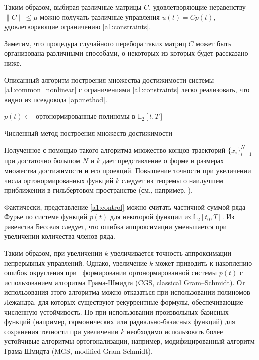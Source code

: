 \documentclass[../main.tex]{subfiles}
\begin{document}
 Таким образом, выбирая различные матрицы $C$, удовлетворяющие неравенству $\| C\| \leqslant \mu $ можно получать различные управления $u(t) = C p(t)$, удовлетворяющие ограничению \eqref{a1:constraints}.
 
 Заметим, что процедура случайного перебора таких матриц $C$ может быть организована различными способами, о некоторых из которых будет рассказано ниже.
 
 Описанный алгоритм построения множества достижимости системы \eqref{a1:common_nonlinear} с ограничениями \eqref{a1:constraints} легко реализовать, что видно из псевдокода \ref{ap:method}.
 \begin{algorithm}[hbt!]
 	$p(t) \gets $ ортонормированные полиномы в $\mathbb{L}_2[t,T]$\;
 	\caption{Численный метод построения множеств достижимости}
 	 \label{ap:method}
 \end{algorithm}
 
 Полученное с помощью такого алгоритма множество концов траекторий $\{x_i\}_{i = 1}^{N}$ при достаточно большом $N$ и $k$ дает представление о форме и размерах множества достижимости и его проекций. 
 Повышение точности при увеличении числа ортонормированных функций $k$ следует из теоремы о наилучшем приближении в гильбертовом пространстве (см., например, \cite{Kolmogorov}). 
 
 Фактически, представление \eqref{a1:control} можно считать частичной суммой ряда Фурье по системе функций $p(t)$ для некоторой функции из $\mathbb{L}_2[t_0, {T}]$. 
 Из равенства Бесселя следует, что ошибка аппроксимации уменьшается при увеличении количества членов ряда. 
 
 Таким образом, при увеличении $k$ увеличивается точность аппроксимации непрерывных управлений. 
 Однако, увеличение $k$ может приводить к накоплению ошибок округления при  формировании ортонормированной системы $p(t)$ с использованием алгоритма Грама-Шмидта (CGS, classical Gram–Schmidt). 
 От использования этого алгоритма можно отказаться при использовании полиномов Лежандра, для которых существуют рекуррентные формулы, обеспечивающие численную устойчивость. 
 Но при использовании произвольных базисных функций (например, гармонических или радиально-базисных функций) для сохранения точности при увеличении $k$ необходимо использовать более устойчивые алгоритмы ортогонализации, например, модифицированный алгоритм Грама-Шмидта (MGS, modified Gram-Schmidt).
 
\end{document}

